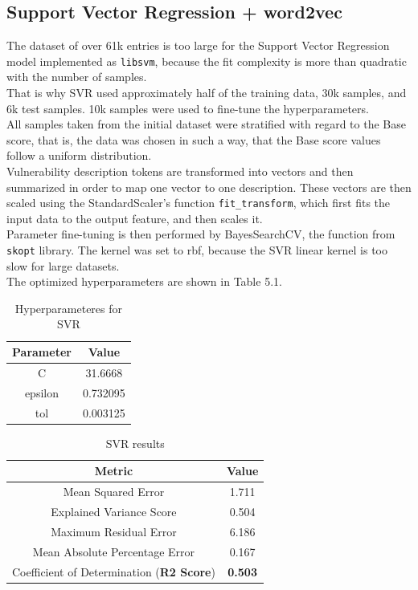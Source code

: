 \documentclass[times, utf8, zavrsni, english]{fer}
\begin{document}
\subsection{Support Vector Regression + word2vec}
The dataset of over 61k entries is too large for the Support Vector Regression model implemented as \texttt{libsvm}, because the fit complexity is more than quadratic with the number of samples.\\
That is why SVR used approximately half of the training data, 30k samples, and 6k test samples. 
10k samples were used to fine-tune the hyperparameters. \\
All samples taken from the initial dataset were stratified with regard to the Base score, that is, the data was chosen in such a way, that the Base score values follow a uniform distribution.\\
Vulnerability description tokens are transformed into vectors and then summarized in order to map one vector to one description.
These vectors are then scaled using the StandardScaler's function \texttt{fit\_transform}, which first fits the input data to the output feature, and then scales it.\\
Parameter fine-tuning is then performed by BayesSearchCV, the function from \texttt{skopt} library. The kernel was set to rbf, because the SVR linear kernel is too slow for large datasets.\\
The optimized hyperparameters are shown in Table 5.1.
\begin{table}[h!]
	\centering
	\begin{tabular}{|| c | c ||} 
		\hline
		Parameter & Value \\ [0.5ex] 
		\hline\hline
		C & 31.6668  \\ \hline
		epsilon & 0.732095 \\ \hline
		tol & 0.003125  \\ 
		\hline
	\end{tabular}
	\caption{Hyperparameteres for SVR}
	\label{table:4}
\end{table}

\begin{table}

	\centering
	\begin{tabular}{|| c | c ||} 
		\hline
		Metric & Value \\ [0.5ex] 
		\hline\hline
		Mean Squared Error & 1.711  \\ \hline
		Explained Variance Score & 0.504\\ \hline
		Maximum Residual Error & 6.186 \\ \hline
		Mean Absolute Percentage Error & 0.167 \\ \hline
		Coefficient of Determination (\textbf{R2 Score}) & \textbf{0.503} \\
		\hline
	\end{tabular}
	\caption{SVR results}
	\label{table:5}

\end{table}
\end{document}
